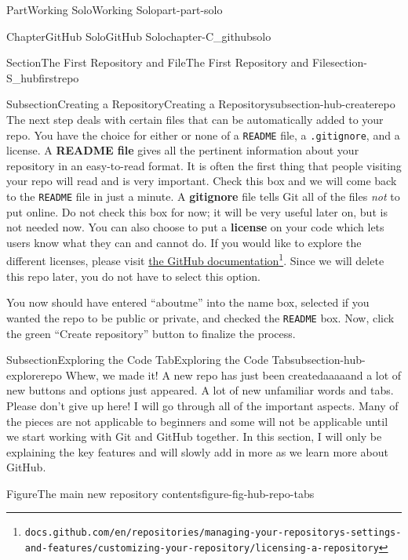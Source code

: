 \documentclass[oneside,10pt,]{book}
\newcommand{\mono}[1]{\texttt{#1}}
\newcommand{\terminology}[1]{\textbf{#1}}
\begin{document}
\begin{partptx}{Part}{Working Solo}{}{Working Solo}{}{}{part-part-solo}
\begin{chapterptx}{Chapter}{GitHub Solo}{}{GitHub Solo}{}{}{chapter-C_githubsolo}
\begin{sectionptx}{Section}{The First Repository and File}{}{The First Repository and File}{}{}{section-S_hubfirstrepo}
\begin{subsectionptx}{Subsection}{Creating a Repository}{}{Creating a Repository}{}{}{subsection-hub-createrepo}
 The next step deals with certain files that can be automatically added to your repo. You have the choice for either or none of a \mono{README} file, a \mono{.gitignore}, and a license. A \terminology{README file} gives all the pertinent information about your repository in an easy-to-read format. It is often the first thing that people visiting your repo will read and is very important. Check this box and we will come back to the \mono{README} file in just a minute. A \terminology{gitignore} file tells Git all of the files \emph{not} to put online. Do not check this box for now; it will be very useful later on, but is not needed now. You can also choose to put a \terminology{license} on your code which lets users know what they can and cannot do. If you would like to explore the different licenses, please visit \href{https://docs.github.com/en/repositories/managing-your-repositorys-settings-and-features/customizing-your-repository/licensing-a-repository}{the GitHub documentation}\footnote{\nolinkurl{docs.github.com/en/repositories/managing-your-repositorys-settings-and-features/customizing-your-repository/licensing-a-repository}\label{fn-hub-createrepo-k-l}}. Since we will delete this repo later, you do not have to select this option.%
\par
You now should have entered ``aboutme'' into the name box, selected if you wanted the repo to be public or private, and checked the \mono{README} box. Now, click the green ``Create repository'' button to finalize the process.%
\end{subsectionptx}
%
%
\typeout{************************************************}
\typeout{************************************************}
%
\begin{subsectionptx}{Subsection}{Exploring the Code Tab}{}{Exploring the Code Tab}{}{}{subsection-hub-explorerepo}
%
Whew, we made it! A new repo has just been created\textellipsis{}aaaaand a lot of new buttons and options just appeared. A lot of new unfamiliar words and tabs. Please don't give up here! I will go through all of the important aspects. Many of the pieces are not applicable to beginners and some will not be applicable until we start working with Git and GitHub together. In this section, I will only be explaining the key features and will slowly add in more as we learn more about GitHub.%
\begin{figureptx}{Figure}{The main new repository contents}{figure-fig-hub-repo-tabs}{}%

\end{figureptx}
\end{subsectionptx}
\end{sectionptx}
\end{chapterptx}
\end{partptx}
\end{document}
